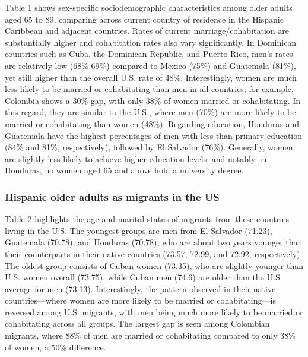\documentclass[
]{article}
\begin{document}
Table 1 shows sex-specific sociodemographic characteristics among older
adults aged 65 to 89, comparing across current country of residence in
the Hispanic Caribbean and adjacent countries. Rates of current
marriage/cohabitation are substantially higher and cohabitation rates
also vary significantly. In Dominican countries such as Cuba, the
Dominican Republic, and Puerto Rico, men's rates are relatively low
(68\%-69\%) compared to Mexico (75\%) and Guatemala (81\%), yet still
higher than the overall U.S. rate of 48\%. Interestingly, women are much
less likely to be married or cohabitating than men in all countries; for
example, Colombia shows a 30\% gap, with only 38\% of women married or
cohabitating. In this regard, they are similar to the U.S., where men
(70\%) are more likely to be married or cohabitating than women (48\%).
Regarding education, Honduras and Guatemala have the highest percentages
of men with less than primary education (84\% and 81\%, respectively),
followed by El Salvador (76\%). Generally, women are slightly less
likely to achieve higher education levels, and notably, in Honduras, no
women aged 65 and above hold a university degree.

\subsubsection{Hispanic older adults as migrants in the
US}\label{hispanic-older-adults-as-migrants-in-the-us}

Table 2 highlights the age and marital status of migrants from these
countries living in the U.S. The youngest groups are men from El
Salvador (71.23), Guatemala (70.78), and Honduras (70.78), who are about
two years younger than their counterparts in their native countries
(73.57, 72.99, and 72.92, respectively). The oldest group consists of
Cuban women (73.35), who are slightly younger than U.S. women overall
(73.75), while Cuban men (74.6) are older than the U.S. average for men
(73.13). Interestingly, the pattern observed in their native
countries---where women are more likely to be married or
cohabitating---is reversed among U.S. migrants, with men being much more
likely to be married or cohabitating across all groups. The largest gap
is seen among Colombian migrants, where 88\% of men are married or
cohabitating compared to only 38\% of women, a 50\% difference.
\end{document}
